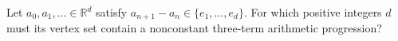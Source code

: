 Let $a_0,a_1,\ldots\in\mathbb R^d$ satisfy $a_{n+1}-a_n\in\{e_1,\ldots,e_d\}$. For which positive integers $d$ must its vertex set contain a nonconstant three-term arithmetic progression?
